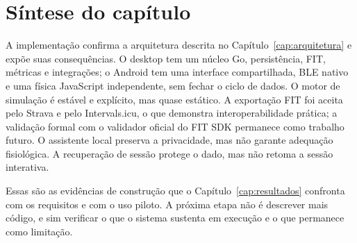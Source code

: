 \section{Síntese do capítulo}
\label{sec:sintese-implementacao}

A implementação confirma a arquitetura descrita no Capítulo~\ref{cap:arquitetura}
e expõe suas consequências. O desktop tem um núcleo Go, persistência, FIT,
métricas e integrações; o Android tem uma interface compartilhada, BLE nativo e
uma física JavaScript independente, sem fechar o ciclo de dados. O motor de
simulação é estável e explícito, mas quase estático. A exportação FIT foi
aceita pelo Strava e pelo Intervals.icu, o que demonstra interoperabilidade
prática; a validação formal com o validador oficial do FIT SDK permanece como
trabalho futuro. O assistente local
preserva a privacidade, mas não garante adequação fisiológica. A recuperação de
sessão protege o dado, mas não retoma a sessão interativa.

Essas são as evidências de construção que o Capítulo~\ref{cap:resultados}
confronta com os requisitos e com o uso piloto. A próxima etapa não é descrever
mais código, e sim verificar o que o sistema sustenta em execução e o que
permanece como limitação.

